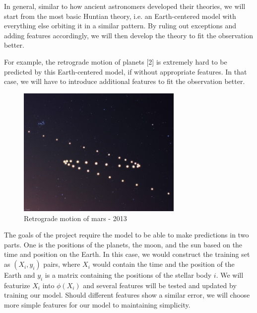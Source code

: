 \documentclass{article}
\begin{document}

In general, similar to how ancient astronomers developed their theories, we will start from the most basic Huntian theory, i.e. an Earth-centered model with everything else orbiting it in a similar pattern. By ruling out exceptions and adding features accordingly, we will then develop the theory to fit the observation better.

For example, the retrograde motion of planets [2] is extremely hard to be predicted by this Earth-centered model, if without appropriate features. In that case, we will have to introduce additional features to fit the observation better.

\begin{figure}[H]
    \centering
    \includegraphics[width=8cm]{mars.jpg}
    \caption{Retrograde motion of mars - 2013}
    \label{fig:mars}
\end{figure}

The goals of the project require the model to be able to make predictions in two parts. One is the positions of the planets, the moon, and the sun based on the time and position on the Earth. In this case, we would construct the training set as $(X_i, y_i)$ pairs, where $X_i$ would contain the time and the position of the Earth and $y_i$ is a matrix containing the positions of the stellar body $i$. We will featurize $X_i$ into $\phi(X_i)$ and several features will be tested and updated by training our model. Should different features show a similar error, we will choose more simple features for our model to maintaining simplicity. %
\end{document}
